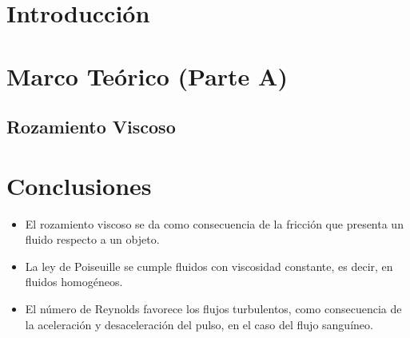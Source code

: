 \documentclass[osajnl,twocolumn,showpacs,superscriptaddress,10pt]{revtex4-2}
\begin{document}
\providecommand{\sumat}[3]{\ensuremath{\sum_{#1}^{#2}{\left\{\hspace{2pt} #3 \hspace{2pt}\right\}}}}
\providecommand{\suma}[3]{\ensuremath{\sum_{#1}^{#2}{#3}}}
\providecommand{\Rarr}[1]{\ensuremath{\hs{#1}\Longrightarrow\hs{#1}}}
\providecommand{\rarr}[1]{\ensuremath{\hs{#1}\longrightarrow\hs{#1}}}

\providecommand{\expo}[1]{\ensuremath{e^{#1}}}
\providecommand{\uvec}[1]{\ensuremath{\hat{#1}}}
%
%


\section{Introducción}

\section{Marco Teórico (Parte A)}
    \subsection{Rozamiento Viscoso}

\section{Conclusiones}
    \begin{itemize}
        \item El rozamiento viscoso se da como consecuencia de la fricción que presenta un fluido respecto a un objeto.
        \item La ley de Poiseuille se cumple fluidos con viscosidad constante, es decir, en fluidos homogéneos.
        \item El número de Reynolds favorece los flujos turbulentos, como consecuencia de la aceleración y desaceleración del pulso, en el caso del flujo sanguíneo.
    \end{itemize}
\end{document}
